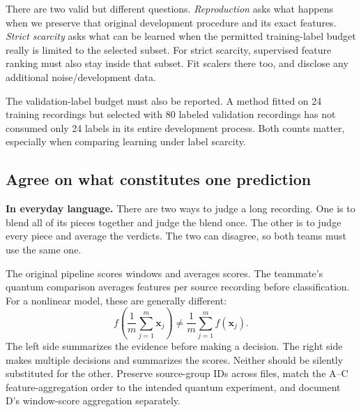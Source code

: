 \documentclass[11pt,letterpaper]{article}
\newcommand{\plain}[1]{\par\smallskip\noindent\textbf{In everyday language.} #1\par\smallskip}
\begin{document}
There are two valid but different questions. \emph{Reproduction} asks what
happens when we preserve that original development procedure and its exact
features. \emph{Strict scarcity} asks what can be learned when the permitted
training-label budget really is limited to the selected subset. For strict
scarcity, supervised feature ranking must also stay inside that subset.
Fit scalers there too, and disclose any additional noise/development data.

The validation-label budget must also be reported. A method fitted on 24
training recordings but selected with 80 labeled validation recordings has
not consumed only 24 labels in its entire development process. Both counts
matter, especially when comparing learning under label scarcity.

\subsection{Agree on what constitutes one prediction}
\plain{There are two ways to judge a long recording. One is to blend all of
its pieces together and judge the blend once. The other is to judge every
piece and average the verdicts. The two can disagree, so both teams must use
the same one.}

The original pipeline scores windows and averages scores. The teammate's
quantum comparison averages features per source recording before classification.
For a nonlinear model, these are generally different:
\begin{equation}
 f\!\left(\frac{1}{m}\sum_{j=1}^m\mathbf{x}_j\right)
 \neq \frac{1}{m}\sum_{j=1}^m f(\mathbf{x}_j).
\end{equation}
The left side summarizes the evidence before making a decision. The right
side makes multiple decisions and summarizes the scores. Neither should be
silently substituted for the other. Preserve source-group IDs across files,
match the A--C feature-aggregation order to the intended quantum experiment,
and document D's window-score aggregation separately.
\end{document}
